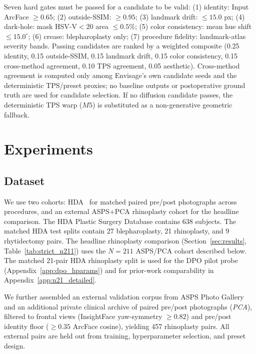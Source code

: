 \documentclass{article}
\newcommand{\method}{Envisage}
\begin{document}
Seven hard gates must be passed for a candidate to be valid: (1) identity:
Input ArcFace $\geq 0.65$; (2) outside-SSIM: $\geq 0.95$; (3) landmark
drift: $\leq 15.0$ px; (4) dark-hole: mask HSV-V$<$20 area $\leq 0.5\%$;
(5) color consistency: mean hue shift $\leq 15.0^\circ$; (6) crease: blepharoplasty only;
(7) procedure fidelity: landmark-atlas severity bands. Passing candidates are
ranked by a weighted composite (0.25 identity, 0.15 outside-SSIM, 0.15
landmark drift, 0.15 color consistency, 0.15 cross-method agreement, 0.10 TPS agreement,
0.05 aesthetic). Cross-method agreement is computed only among \method{}'s own
candidate seeds and the deterministic TPS/preset proxies; no baseline outputs
or postoperative ground truth are used for candidate selection. If no
diffusion candidate passes, the deterministic TPS warp ($M5$) is substituted
as a non-generative geometric fallback.

\section{Experiments}
\label{sec:experiments}

\subsection{Dataset}

We use two cohorts: HDA~\citep{rathgeb2020plastic} for matched paired
pre/post photographs across procedures, and an external ASPS+PCA
rhinoplasty cohort for the headline comparison. The HDA Plastic Surgery
Database contains 638
subjects. The matched HDA test splits contain 27 blepharoplasty, 21 rhinoplasty,
and 9 rhytidectomy pairs. The headline rhinoplasty comparison
(Section~\ref{sec:results}, Table~\ref{tab:strict_n211}) uses the
$N{=}211$ ASPS/PCA cohort described below. The matched 21-pair HDA
rhinoplasty split is used for the DPO pilot probe (Appendix~\ref{app:dpo_hparams})
and for prior-work comparability in Appendix~\ref{app:n21_detailed}.

We further assembled an external validation corpus from ASPS Photo
Gallery~\citep{asps2024gallery} and an additional private clinical archive
of paired pre/post photographs (\emph{PCA}), filtered to frontal views
(InsightFace yaw-symmetry $\geq 0.82$) and pre/post identity floor
($\geq 0.35$ ArcFace cosine), yielding 457 rhinoplasty pairs. All external
pairs are held out from training, hyperparameter selection, and preset design.
\end{document}
